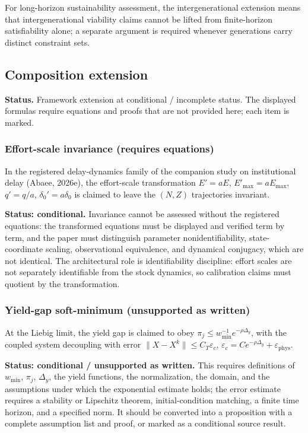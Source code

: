For long-horizon sustainability assessment, the intergenerational extension means that intergenerational viability claims cannot be lifted from finite-horizon satisfiability alone; a separate argument is required whenever generations carry distinct constraint sets.

\subsection{Composition extension}

\noindent\textbf{Status.} Framework extension at conditional / incomplete status. The displayed formulas require equations and proofs that are not provided here; each item is marked.

\subsubsection{Effort-scale invariance (requires equations)}

In the registered delay-dynamics family of the companion study on institutional delay (Abaee, 2026e), the effort-scale transformation $E' = aE$, $E'_{\max} = aE_{\max}$, $q' = q/a$, $\delta_0' = a\delta_0$ is claimed to leave the $(N, Z)$ trajectories invariant.

\textbf{Status: conditional.} Invariance cannot be assessed without the registered equations: the transformed equations must be displayed and verified term by term, and the paper must distinguish parameter nonidentifiability, state-coordinate scaling, observational equivalence, and dynamical conjugacy, which are not identical. The architectural role is identifiability discipline: effort scales are not separately identifiable from the stock dynamics, so calibration claims must quotient by the transformation.

\subsubsection{Yield-gap soft-minimum (unsupported as written)}

At the Liebig limit, the yield gap is claimed to obey $\pi_j \le w_{\min}^{-1} e^{-\rho \Delta_y}$, with the coupled system decoupling with error $\|X - X^k\| \le C_T \varepsilon_c$, $\varepsilon_c = C e^{-\rho \Delta_y} + \varepsilon_{\mathrm{phys}}$.

\textbf{Status: conditional / unsupported as written.} This requires definitions of $w_{\min}$, $\pi_j$, $\Delta_y$, the yield functions, the normalization, the domain, and the assumptions under which the exponential estimate holds; the error estimate requires a stability or Lipschitz theorem, initial-condition matching, a finite time horizon, and a specified norm. It should be converted into a proposition with a complete assumption list and proof, or marked as a conditional source result.

